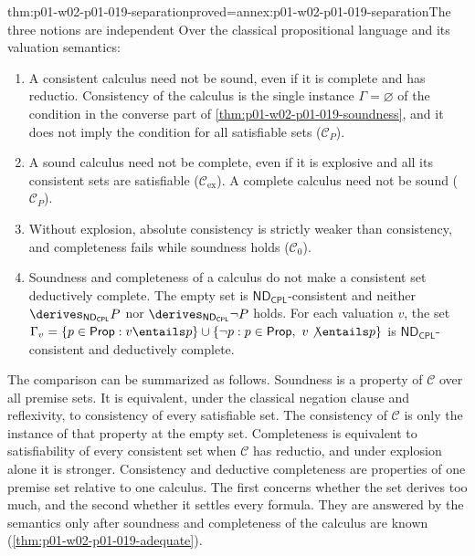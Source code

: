 \begin{hbcorollary}{thm:p01-w02-p01-019-separation}{proved=annex:p01-w02-p01-019-separation}{The three notions are independent}
Over the classical propositional language and its valuation semantics:
\begin{enumerate}
  \item A consistent calculus need not be sound, even if it is complete and
        has reductio. Consistency of the calculus is the single instance
        \(\Gamma=\varnothing\) of the condition in the converse part of
        \cref{thm:p01-w02-p01-019-soundness}, and it does not imply the
        condition for all satisfiable sets (\(\mathcal C_P\)).
  \item A sound calculus need not be complete, even if it is explosive and
        all its consistent sets are satisfiable (\(\mathcal C_{\mathrm{ex}}\)).
        A complete calculus need not be sound (\(\mathcal C_P\)).
  \item Without explosion, absolute consistency is strictly weaker than
        consistency, and completeness fails while soundness holds
        (\(\mathcal C_0\)).
  \item Soundness and completeness of a calculus do not make a consistent set
        deductively complete. The empty set is
        \(\mathsf{ND}_{\mathsf{CPL}}\)-consistent and neither
        \(\derives_{\mathsf{ND}_{\mathsf{CPL}}}P\) nor
        \(\derives_{\mathsf{ND}_{\mathsf{CPL}}}\neg P\) holds. For each
        valuation \(v\), the set
        \(\Gamma_v=\{p\in\mathsf{Prop}:v\entails p\}\cup
        \{\neg p:p\in\mathsf{Prop},\ v\not\entails p\}\) is
        \(\mathsf{ND}_{\mathsf{CPL}}\)-consistent and deductively complete.
\end{enumerate}
\end{hbcorollary}

The comparison can be summarized as follows. Soundness is a property of
\(\mathcal C\) over all premise sets. It is equivalent, under the classical
negation clause and reflexivity, to consistency of every satisfiable set. The
consistency of \(\mathcal C\) is only the instance of that property at the
empty set. Completeness is equivalent to satisfiability of every consistent
set when \(\mathcal C\) has reductio, and under explosion alone it is
stronger. Consistency and deductive completeness are properties of one
premise set relative to one calculus. The first concerns whether the set
derives too much, and the second whether it settles every formula. They are
answered by the semantics only after soundness and completeness of the
calculus are known (\cref{thm:p01-w02-p01-019-adequate}).

